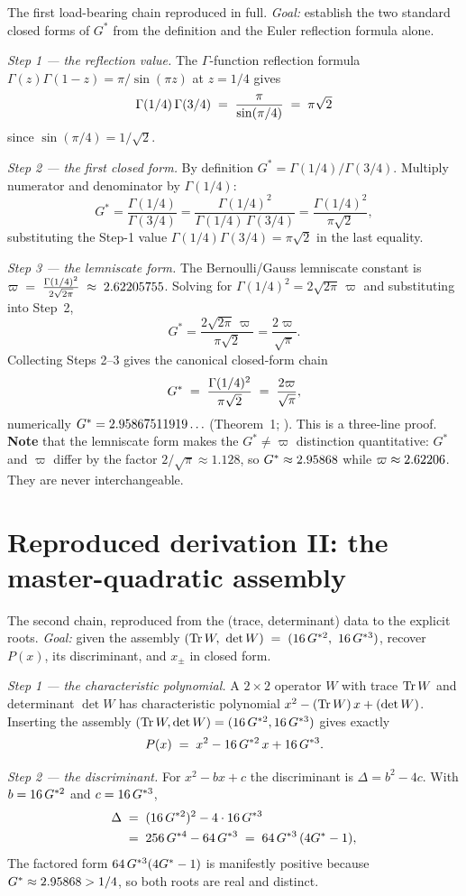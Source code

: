 The first load-bearing chain reproduced in full. \emph{Goal:} establish the two
standard closed forms of $G^{*}$ from the definition and the Euler reflection
formula alone.

\emph{Step 1 --- the reflection value.} The $\Gamma$-function reflection
formula $\Gamma(z)\Gamma(1-z)=\pi/\sin(\pi z)$ at $z=1/4$ gives
\[
  \Gamma(1/4)\,\Gamma(3/4) \;=\; \frac{\pi}{\sin(\pi/4)} \;=\; \pi\sqrt 2
\]
since $\sin(\pi/4)=1/\sqrt2$.

\emph{Step 2 --- the first closed form.} By definition $G^{*}=\Gamma(1/4)/\Gamma(3/4)$.
Multiply numerator and denominator by $\Gamma(1/4)$:
\[
  G^{*} = \frac{\Gamma(1/4)}{\Gamma(3/4)}
        = \frac{\Gamma(1/4)^{2}}{\Gamma(1/4)\,\Gamma(3/4)}
        = \frac{\Gamma(1/4)^{2}}{\pi\sqrt2},
\]
substituting the Step-1 value $\Gamma(1/4)\Gamma(3/4)=\pi\sqrt2$ in the last
equality.

\emph{Step 3 --- the lemniscate form.} The Bernoulli/Gauss lemniscate constant
is $\varpi \;=\; \frac{\Gamma(1/4)^2}{2\sqrt{2\pi}} \;\approx\; 2.62205755$. Solving for $\Gamma(1/4)^{2}=2\sqrt{2\pi}\,\varpi$ and
substituting into Step~2,
\[
  G^{*} = \frac{2\sqrt{2\pi}\,\varpi}{\pi\sqrt2}
        = \frac{2\varpi}{\sqrt\pi}.
\]
Collecting Steps 2--3 gives the canonical closed-form chain
\[
  G^{*} \;=\; \frac{\Gamma(1/4)^2}{\pi\sqrt 2} \;=\; \frac{2\varpi}{\sqrt\pi},
\]
numerically $G^{*}=2.95867511919\ldots$  (Theorem~1; ). This is a
three-line proof. \textbf{Note} that the lemniscate form makes the $G^{*}\neq\varpi$
distinction quantitative: $G^{*}$ and $\varpi$ differ by the factor
$2/\sqrt\pi\approx1.128$, so $G^{*}\approx2.95868$ while
$\varpi\approx2.62206$. They are never interchangeable.

\section{Reproduced derivation II: the master-quadratic assembly}
\label{sec:math-deriv-masterquad}

The second chain, reproduced from the (trace, determinant) data to the explicit
roots. \emph{Goal:} given the assembly $(\operatorname{Tr} W,\ \det W) \;=\; (16\,G^{*2},\ 16\,G^{*3})$, recover $P(x)$, its
discriminant, and $x_\pm$ in closed form.

\emph{Step 1 --- the characteristic polynomial.} A $2\times2$ operator $W$ with
trace $\operatorname{Tr} W$ and determinant $\det W$ has characteristic polynomial
$x^{2}-(\operatorname{Tr} W)\,x+(\det W)$. Inserting the assembly $(\operatorname{Tr} W,\det W)=(16\,G^{*2},16\,G^{*3})$
gives exactly
\[
  P(x) \;=\; x^{2} - 16\,G^{*2}\,x + 16\,G^{*3}.
\]

\emph{Step 2 --- the discriminant.} For $x^{2}-bx+c$ the discriminant is
$\Delta=b^{2}-4c$. With $b=16\,G^{*2}$ and $c=16\,G^{*3}$,
\[
  \begin{aligned} \Delta &\;=\; (16\,G^{*2})^{2} - 4\cdot 16\,G^{*3} \\ &\;=\; 256\,G^{*4} - 64\,G^{*3} \;=\; 64\,G^{*3}\,(4G^{*} - 1), \end{aligned}
\]
The factored form $64\,G^{*3}(4G^{*}-1)$ is manifestly positive because
$G^{*}\approx2.95868>1/4$, so both roots are real and distinct.

